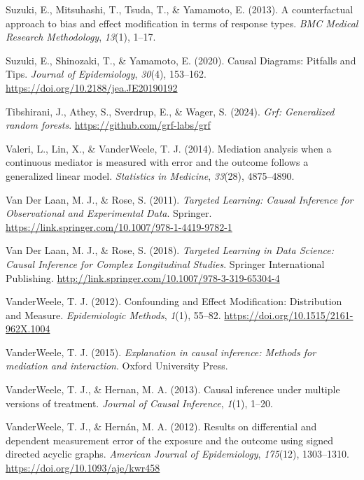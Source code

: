 \documentclass[
  single column]{article}
\newlength{\cslhangindent}
\newenvironment{CSLReferences}[2] %
 {\begin{list}{}{%
  \setlength{\itemindent}{0pt}
  \setlength{\leftmargin}{0pt}
  \setlength{\parsep}{0pt}
  \ifodd #1
   \setlength{\leftmargin}{\cslhangindent}
   \setlength{\itemindent}{-1\cslhangindent}
  \fi
  \setlength{\itemsep}{#2\baselineskip}}}
 {\end{list}}
\begin{document}
\begin{CSLReferences}{1}{0}
Suzuki, E., Mitsuhashi, T., Tsuda, T., \& Yamamoto, E. (2013). A
counterfactual approach to bias and effect modification in terms of
response types. \emph{BMC Medical Research Methodology}, \emph{13}(1),
1--17.

Suzuki, E., Shinozaki, T., \& Yamamoto, E. (2020). Causal Diagrams:
Pitfalls and Tips. \emph{Journal of Epidemiology}, \emph{30}(4),
153--162. \url{https://doi.org/10.2188/jea.JE20190192}

Tibshirani, J., Athey, S., Sverdrup, E., \& Wager, S. (2024). \emph{Grf:
Generalized random forests}. \url{https://github.com/grf-labs/grf}

Valeri, L., Lin, X., \& VanderWeele, T. J. (2014). Mediation analysis
when a continuous mediator is measured with error and the outcome
follows a generalized linear model. \emph{Statistics in Medicine},
\emph{33}(28), 4875--4890.

Van Der Laan, M. J., \& Rose, S. (2011). \emph{Targeted Learning: Causal
Inference for Observational and Experimental Data}. Springer.
\url{https://link.springer.com/10.1007/978-1-4419-9782-1}

Van Der Laan, M. J., \& Rose, S. (2018). \emph{Targeted Learning in Data
Science: Causal Inference for Complex Longitudinal Studies}. Springer
International Publishing.
\url{http://link.springer.com/10.1007/978-3-319-65304-4}

VanderWeele, T. J. (2012). Confounding and Effect Modification:
Distribution and Measure. \emph{Epidemiologic Methods}, \emph{1}(1),
55--82. \url{https://doi.org/10.1515/2161-962X.1004}

VanderWeele, T. J. (2015). \emph{Explanation in causal inference:
Methods for mediation and interaction}. Oxford University Press.

VanderWeele, T. J., \& Hernan, M. A. (2013). Causal inference under
multiple versions of treatment. \emph{Journal of Causal Inference},
\emph{1}(1), 1--20.

VanderWeele, T. J., \& Hernán, M. A. (2012). Results on differential and
dependent measurement error of the exposure and the outcome using signed
directed acyclic graphs. \emph{American Journal of Epidemiology},
\emph{175}(12), 1303--1310. \url{https://doi.org/10.1093/aje/kwr458}


\end{CSLReferences}
\end{document}
